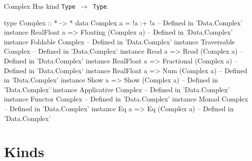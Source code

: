 \documentclass[openany, 11pt]{book}
\begin{document}
\begin{intuition}{Complex}{}
	Has kind \texttt{Type $\rightarrow$ Type}.
	\begin{haskell}{}
type Complex :: * -> *
data Complex a = !a :+ !a
-- Defined in 'Data.Complex’
instance RealFloat a => Floating (Complex a)
-- Defined in 'Data.Complex’
instance Foldable Complex -- Defined in 'Data.Complex’
instance Traversable Complex -- Defined in 'Data.Complex’
instance Read a => Read (Complex a) -- Defined in 'Data.Complex’
instance RealFloat a => Fractional (Complex a)
-- Defined in 'Data.Complex’
instance RealFloat a => Num (Complex a)
-- Defined in 'Data.Complex’
instance Show a => Show (Complex a) -- Defined in 'Data.Complex’
instance Applicative Complex -- Defined in 'Data.Complex’
instance Functor Complex -- Defined in 'Data.Complex’
instance Monad Complex -- Defined in 'Data.Complex’
instance Eq a => Eq (Complex a) -- Defined in 'Data.Complex’
\end{haskell}
\end{intuition}

\section{Kinds}
\end{document}
